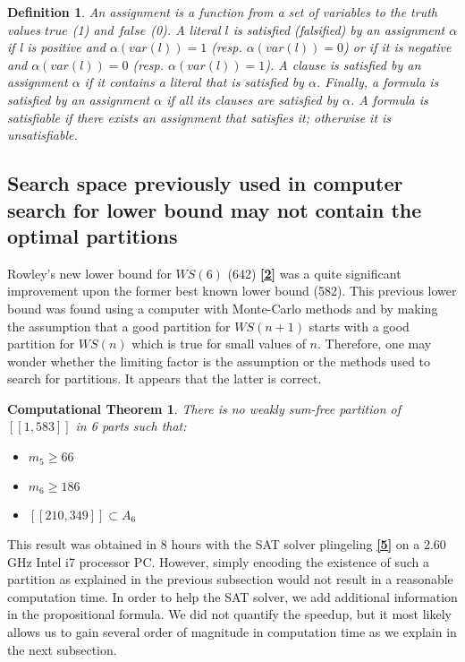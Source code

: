 \documentclass{article}
\newtheorem{definition}{Definition}[section]
\newtheorem{computational theorem}{Computational Theorem}[section]
\begin{document}
\begin{definition}
An \textit{assignment} is a function from a set of variables to the truth values \(true\) (1) and \(false\) (0). A literal \(l\) is 
\textit{satisfied} (\textit{falsified}) by an assignment \(\alpha\) if l is positive and \(\alpha(var (l)) = 1\) 
(resp. \(\alpha(var (l)) = 0\)) or if it is negative and \(\alpha(var (l)) = 0\) (resp. \(\alpha(var (l)) = 1\)). A clause is \textit{satisfied} 
by an assignment \(\alpha\) if it contains a literal that is satisfied by \(\alpha\). Finally, a formula is \textit{satisfied} by an assignment 
\(\alpha\) if all its clauses are satisfied by \(\alpha\). A formula is \textit{satisfiable} if there exists an assignment that satisfies it; 
otherwise it is \textit{unsatisfiable}.
\end{definition}


\subsection{Search space previously used in computer search for lower bound may not contain the optimal partitions}

Rowley's new lower bound for \(WS(6)\) (642)  \hyperlink{label2}{\textbf{[2]}} was a quite significant improvement upon the former 
best known lower bound (582). This previous lower bound was found using a computer with Monte-Carlo methods and by making the 
assumption that a good partition for \(WS(n+1)\) starts with a good partition for \(WS(n)\) which is true for small values of \(n\).
Therefore, one may wonder whether the limiting factor is the assumption or the methods used to search for partitions. It appears that 
the latter is correct.

\begin{computational theorem}
There is no weakly sum-free partition of \([\![1,583]\!]\) in 6 parts such that:
\begin{itemize}
\item \(m_5 \ge 66\)
\item \(m_6 \ge 186\)
\item \([\![210,349]\!] \subset A_6\)
\end{itemize}  
\end{computational theorem}

This result was obtained in 8 hours with the SAT solver plingeling \hyperlink{label5}{\textbf{[5]}} on a 2.60 GHz Intel i7 processor PC.
However, simply encoding the existence of such a partition as explained in the previous subsection would not result in a reasonable 
computation time. In order to help the SAT solver, we add additional information in the propositional formula. We did not quantify the 
speedup, but it most likely allows us to gain several order of magnitude in computation time as we explain in the next subsection.
\end{document}
